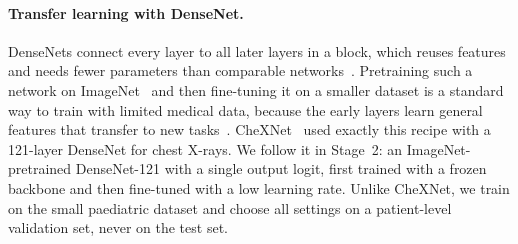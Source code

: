 \paragraph{Transfer learning with DenseNet.}
DenseNets connect every layer to all later layers in a block, which reuses features and needs fewer parameters than comparable networks~\cite{huang2017densenet}.
Pretraining such a network on ImageNet~\cite{deng2009imagenet} and then fine-tuning it on a smaller dataset is a standard way to train with limited medical data,
because the early layers learn general features that transfer to new tasks~\cite{yosinski2014transferable}.
CheXNet~\cite{rajpurkar2017chexnet} used exactly this recipe with a 121-layer DenseNet for chest X-rays.
We follow it in Stage~2: an ImageNet-pretrained DenseNet-121 with a single output logit, first trained with a frozen backbone and then fine-tuned with a low learning rate.
Unlike CheXNet, we train on the small paediatric dataset and choose all settings on a patient-level validation set, never on the test set.
